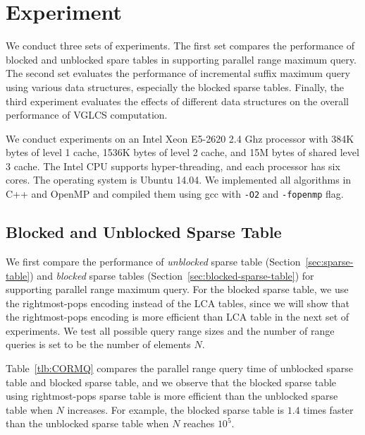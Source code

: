 \section{Experiment} \label{sec:Experiment}

We conduct three sets of experiments.  The first set compares the
performance of blocked and unblocked spare tables in supporting parallel
range maximum query.  The second set evaluates the performance of
incremental suffix maximum query using various data structures,
especially the blocked sparse tables.  Finally, the third experiment
evaluates the effects of different data structures on the overall
performance of VGLCS computation.

We conduct experiments on an Intel Xeon E5-2620 2.4 Ghz processor with
384K bytes of level 1 cache, 1536K bytes of level 2 cache, and 15M
bytes of shared level 3 cache.  The Intel CPU supports
hyper-threading, and each processor has six cores.  The operating
system is Ubuntu 14.04.  We implemented all algorithms in C++ and
OpenMP and compiled them using gcc with {\tt -O2} and {\tt -fopenmp}
flag.

\subsection{Blocked and Unblocked Sparse Table}

We first compare the performance of {\em unblocked} sparse table
(Section~\ref{sec:sparse-table}) and {\em blocked} sparse tables
(Section~\ref{sec:blocked-sparse-table}) for supporting parallel range
maximum query.  For the blocked sparse table, we use the
rightmost-pops encoding instead of the LCA tables, since we will show
that the rightmost-pops encoding is more efficient than LCA table in
the next set of experiments.  We test all possible query range sizes
and the number of range queries is set to be the number of elements
$N$.

Table~\ref{tlb:CORMQ} compares the parallel range query time of
unblocked sparse table and blocked sparse table, and we observe that
the blocked sparse table using rightmost-pops sparse table is more
efficient than the unblocked sparse table when $N$ increases.  For
example, the blocked sparse table is $1.4$ times faster than the
unblocked sparse table when $N$ reaches $10^5$.

